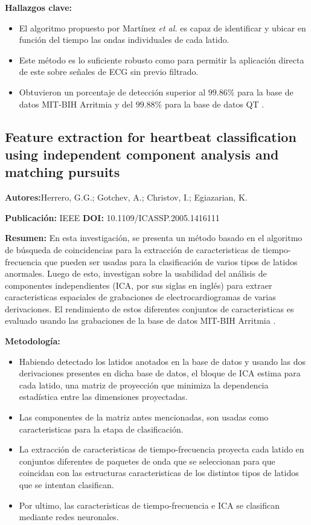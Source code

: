 \documentclass[spanish,11pt,letterpaper,oneside]{memoir}
\begin{document}
\textbf{Hallazgos clave:}
\begin{itemize}
	\item El algoritmo propuesto por Martínez \textit{et al.} es capaz de identificar y ubicar en función del tiempo las ondas individuales de cada latido.
	\item Este método es lo suficiente robusto como para permitir la aplicación directa de este sobre señales de ECG sin previo filtrado.
	\item Obtuvieron un porcentaje de detección superior al $99.86\%$ para la base de datos MIT-BIH Arritmia \cite{arritmiadb} y del $99.88\%$ para la base de datos QT \cite{qtdb}.
\end{itemize}

\subsection{Feature extraction for heartbeat classification using independent component analysis and matching pursuits \cite{Herrero05}}

\textbf{Autores:}Herrero, G.G.; Gotchev, A.; Christov, I.; Egiazarian, K.

\textbf{Publicación:} IEEE
\textbf{DOI:} 10.1109/ICASSP.2005.1416111

\textbf{Resumen:} En esta investigación, se presenta un método basado en el algoritmo de búsqueda de coincidencias para la extracción de caracteristicas de tiempo-frecuencia que pueden ser usadas para la clasificación de varios tipos de latidos anormales. Luego de esto, investigan sobre la usabilidad del análisis de componentes independientes (ICA, por sus siglas en inglés) para extraer caracteristicas espaciales de grabaciones de electrocardiogramas de varias derivaciones. El rendimiento de estos diferentes conjuntos de caracteristicas es evaluado usando las grabaciones de la base de datos MIT-BIH Arritmia \cite{arritmiadb}.

\textbf{Metodología:} 
\begin{itemize}
	\item Habiendo detectado los latidos anotados en la base de datos y usando las dos derivaciones presentes en dicha base de datos, el bloque de ICA estima para cada latido, una matriz de proyección que minimiza la dependencia estadística entre las dimensiones proyectadas.
	\item Las componentes de la matriz antes mencionadas, son usadas como caracteristicas para la etapa de clasificación.
	\item La extracción de caracteristicas de tiempo-frecuencia proyecta cada latido en conjuntos diferentes de paquetes de onda que se seleccionan para que coincidan con las estructuras caracteristicas de los distintos tipos de latidos que se intentan clasifican.
	\item Por ultimo, las caracteristicas de tiempo-frecuencia e ICA se clasifican mediante redes neuronales.
\end{itemize}
\end{document}
